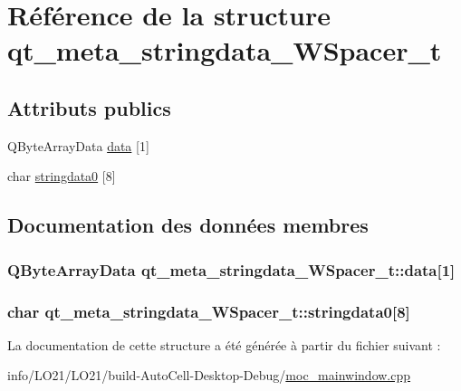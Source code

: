 \hypertarget{structqt__meta__stringdata___w_spacer__t}{}\section{Référence de la structure qt\+\_\+meta\+\_\+stringdata\+\_\+\+W\+Spacer\+\_\+t}
\label{structqt__meta__stringdata___w_spacer__t}
\subsection*{Attributs publics}
\begin{DoxyCompactItemize}
\item 
Q\+Byte\+Array\+Data \hyperlink{structqt__meta__stringdata___w_spacer__t_a31ba163e897c2e33b35ac19722058fa0}{data} \mbox{[}1\mbox{]}
\item 
char \hyperlink{structqt__meta__stringdata___w_spacer__t_a6aa496e58add48e1d6dc9b3b615aa03d}{stringdata0} \mbox{[}8\mbox{]}
\end{DoxyCompactItemize}


\subsection{Documentation des données membres}
\subsubsection[{\texorpdfstring{data}{data}}]{\setlength{\rightskip}{0pt plus 5cm}Q\+Byte\+Array\+Data qt\+\_\+meta\+\_\+stringdata\+\_\+\+W\+Spacer\+\_\+t\+::data\mbox{[}1\mbox{]}}\hypertarget{structqt__meta__stringdata___w_spacer__t_a31ba163e897c2e33b35ac19722058fa0}{}\label{structqt__meta__stringdata___w_spacer__t_a31ba163e897c2e33b35ac19722058fa0}
\subsubsection[{\texorpdfstring{stringdata0}{stringdata0}}]{\setlength{\rightskip}{0pt plus 5cm}char qt\+\_\+meta\+\_\+stringdata\+\_\+\+W\+Spacer\+\_\+t\+::stringdata0\mbox{[}8\mbox{]}}\hypertarget{structqt__meta__stringdata___w_spacer__t_a6aa496e58add48e1d6dc9b3b615aa03d}{}\label{structqt__meta__stringdata___w_spacer__t_a6aa496e58add48e1d6dc9b3b615aa03d}


La documentation de cette structure a été générée à partir du fichier suivant \+:\begin{DoxyCompactItemize}
\item 
info/\+L\+O21/\+L\+O21/build-\/\+Auto\+Cell-\/\+Desktop-\/\+Debug/\hyperlink{moc__mainwindow_8cpp}{moc\+\_\+mainwindow.\+cpp}\end{DoxyCompactItemize}

